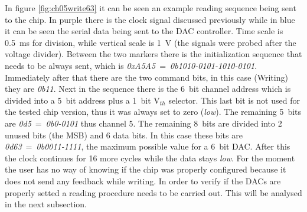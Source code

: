 \noindent In figure \ref{fig:ch05write63} it can be seen an example reading sequence being sent to the chip. In purple there is the clock signal discussed previously while in blue it can be seen the serial data being sent to the DAC controller.
Time scale is 0.5~ms for division, while vertical scale is 1~V (the signals were probed after the voltage divider). 
Between the two markers there is the initialization sequence that needs to be always sent, which is \textit{0xA5A5}~=~\textit{0b1010-0101-1010-0101}.
Immediately after that there are the two command bits, in this case (Writing) they are \textit{0b11}.
Next in the sequence there is the 6~bit channel address which is divided into a 5~bit address plus a 1~bit V$_{th}$ selector.
This last bit is not used for the tested chip version, thus it was always set to zero (\textit{low}).
The remaining 5~bits are \textit{0d5}~=~\textit{0b0-0101} thus channel 5. The remaining 8~bits are divided into 2 unused bits (the MSB) and 6 data bits.
In this case these bits are \textit{0d63}~=~\textit{0b0011-1111}, the maximum possible value for a 6~bit DAC.
After this the clock continues for 16 more cycles while the data stays \textit{low}.
For the moment the user has no way of knowing if the chip was properly configured because it does not send any feedback while writing. In order to verify if the DACs are properly setted a reading procedure needs to be carried out. This will be analysed in the next subsection.  

